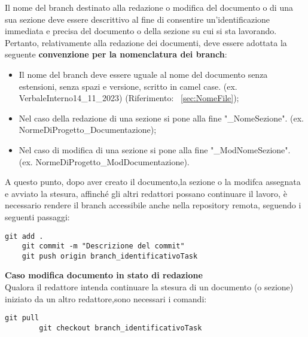     Il nome del branch destinato alla redazione o modifica del documento o di una sua sezione deve essere descrittivo al fine di consentire un'identificazione immediata e precisa del documento o della sezione su cui si sta lavorando. Pertanto, relativamente alla redazione dei documenti, deve essere adottata la seguente \textbf{convenzione per la nomenclatura dei branch}:
\begin{itemize}
    \item  Il nome del branch deve essere uguale al nome del documento senza estensioni, senza spazi e versione, scritto in camel case. (ex. VerbaleInterno14\_11\_2023) (Riferimento: ~\ref{sec:NomeFile});
    \item  Nel caso della redazione di una sezione si pone alla fine "\_NomeSezione". (ex. NormeDiProgetto\_Documentazione);
    \item Nel caso di modifica di una sezione si pone alla fine "\_ModNomeSezione". (ex. NormeDiProgetto\_ModDocumentazione).
\end{itemize}

A questo punto, dopo aver creato il documento,la sezione o la modifca assegnata e avviato la stesura, affinché gli altri redattori possano continuare il lavoro, è necessario rendere il branch accessibile anche nella repository remota, seguendo i seguenti passaggi:
\begin{lstlisting}[style=code]
    git add .
    git commit -m "Descrizione del commit"
    git push origin branch_identificativoTask
        \end{lstlisting}




\textbf{Caso modifica documento in stato di redazione}\\
Qualora il redattore intenda continuare la stesura di un documento (o sezione) iniziato da un altro redattore,sono necessari i comandi:

\begin{lstlisting}[style=code]
        git pull
        git checkout branch_identificativoTask

        \end{lstlisting}

